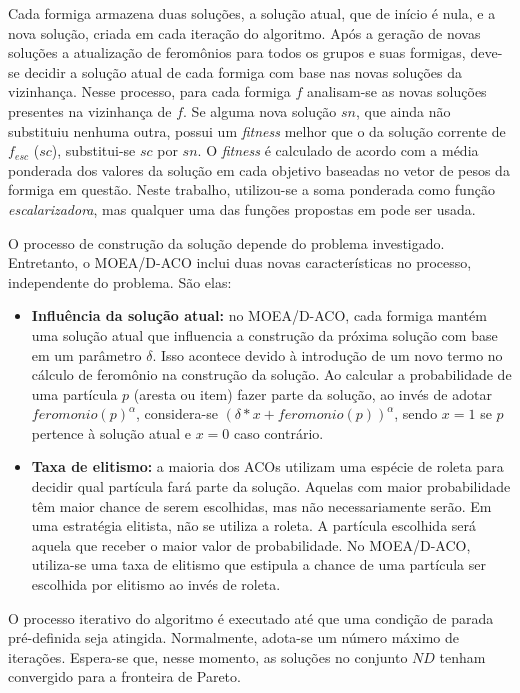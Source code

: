 Cada formiga armazena duas soluções, a solução atual, que de início é nula, e a nova solução, criada em cada iteração do algoritmo. Após a geração de novas soluções a atualização de feromônios para todos os grupos e suas formigas, deve-se decidir a solução atual de cada formiga com base nas novas soluções da vizinhança. Nesse processo, para cada formiga $f$ analisam-se as novas soluções presentes na vizinhança de $f$. Se alguma nova solução $sn$, que ainda não substituiu nenhuma outra, possui um \textit{fitness} melhor que o da solução corrente de $f_{esc}$ ($sc$), substitui-se $sc$ por $sn$. O \textit{fitness} é calculado de acordo com a média ponderada dos valores da solução em cada objetivo baseadas no vetor de pesos da formiga em questão. Neste trabalho, utilizou-se a soma ponderada como função \textit{escalarizadora}, mas qualquer uma das funções propostas em \cite{Zhang2007} pode ser usada.

O processo de construção da solução depende do problema investigado. Entretanto, o MOEA/D-ACO inclui duas novas características no processo, independente do problema. São elas:

\begin{itemize}
	\item \textbf{Influência da solução atual:} no MOEA/D-ACO, cada formiga mantém uma solução atual que influencia a construção da próxima solução com base em um parâmetro $\delta$. Isso acontece devido à introdução de um novo termo no cálculo de feromônio na construção da solução. Ao calcular a probabilidade de uma partícula $p$ (aresta ou item) fazer parte da solução, ao invés de adotar $feromonio(p)^\alpha$, considera-se $(\delta * x + feromonio(p))^\alpha$, sendo $x = 1$ se $p$ pertence à solução atual e $x = 0$ caso contrário.
	\item \textbf{Taxa de elitismo:} a maioria dos ACOs utilizam uma espécie de roleta para decidir qual partícula fará parte da solução. Aquelas com maior probabilidade têm maior chance de serem escolhidas, mas não necessariamente serão. Em uma estratégia elitista, não se utiliza a roleta. A partícula escolhida será aquela que receber o maior valor de probabilidade. No MOEA/D-ACO, utiliza-se uma taxa de elitismo que estipula a chance de uma partícula ser escolhida por elitismo ao invés de roleta.
\end{itemize}

O processo iterativo do algoritmo é executado até que uma condição de parada pré-definida seja atingida. Normalmente, adota-se um número máximo de iterações. Espera-se que, nesse momento, as soluções no conjunto $ND$ tenham convergido para a fronteira de Pareto.


